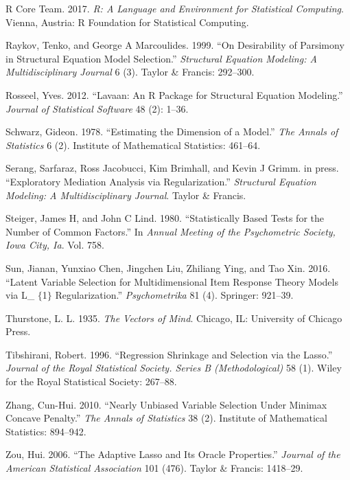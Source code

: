 \documentclass[article]{jss}
\begin{document}
\hypertarget{ref-statspackage}{}
R Core Team. 2017. \emph{R: A Language and Environment for Statistical
Computing}. Vienna, Austria: R Foundation for Statistical Computing.

\hypertarget{ref-raykov1999desirability}{}
Raykov, Tenko, and George A Marcoulides. 1999. ``On Desirability of
Parsimony in Structural Equation Model Selection.'' \emph{Structural
Equation Modeling: A Multidisciplinary Journal} 6 (3). Taylor \&
Francis: 292--300.

\hypertarget{ref-rosseel2012}{}
Rosseel, Yves. 2012. ``Lavaan: An R Package for Structural Equation
Modeling.'' \emph{Journal of Statistical Software} 48 (2): 1--36.

\hypertarget{ref-schwarz1978estimating}{}
Schwarz, Gideon. 1978. ``Estimating the Dimension of a Model.''
\emph{The Annals of Statistics} 6 (2). Institute of Mathematical
Statistics: 461--64.

\hypertarget{ref-serang2017xmed}{}
Serang, Sarfaraz, Ross Jacobucci, Kim Brimhall, and Kevin J Grimm. in
press. ``Exploratory Mediation Analysis via Regularization.''
\emph{Structural Equation Modeling: A Multidisciplinary Journal}. Taylor
\& Francis.

\hypertarget{ref-steiger1980}{}
Steiger, James H, and John C Lind. 1980. ``Statistically Based Tests for
the Number of Common Factors.'' In \emph{Annual Meeting of the
Psychometric Society, Iowa City, Ia}. Vol. 758.

\hypertarget{ref-sun2016latent}{}
Sun, Jianan, Yunxiao Chen, Jingchen Liu, Zhiliang Ying, and Tao Xin.
2016. ``Latent Variable Selection for Multidimensional Item Response
Theory Models via L\_ \(\{\)1\(\}\) Regularization.''
\emph{Psychometrika} 81 (4). Springer: 921--39.

\hypertarget{ref-thurstone1937}{}
Thurstone, L. L. 1935. \emph{The Vectors of Mind}. Chicago, IL:
University of Chicago Press.

\hypertarget{ref-Tibshirani1996}{}
Tibshirani, Robert. 1996. ``Regression Shrinkage and Selection via the
Lasso.'' \emph{Journal of the Royal Statistical Society. Series B
(Methodological)} 58 (1). Wiley for the Royal Statistical Society:
267--88.

\hypertarget{ref-zhang2010nearly}{}
Zhang, Cun-Hui. 2010. ``Nearly Unbiased Variable Selection Under Minimax
Concave Penalty.'' \emph{The Annals of Statistics} 38 (2). Institute of
Mathematical Statistics: 894--942.

\hypertarget{ref-zou2006adaptive}{}
Zou, Hui. 2006. ``The Adaptive Lasso and Its Oracle Properties.''
\emph{Journal of the American Statistical Association} 101 (476). Taylor
\& Francis: 1418--29.
\end{document}
